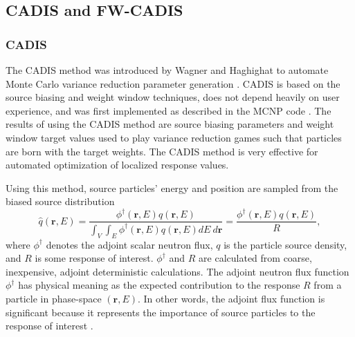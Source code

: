 \documentclass{article} %
\newcommand{\vecr}{\textbf{r}}
\newcommand{\qhat}{\ensuremath{\hat{q}}}
\newcommand{\fwc}{\mbox{FW-CADIS}}
\begin{document}
\subsection{CADIS and \fwc}

\subsubsection{CADIS}

The CADIS method was introduced by Wagner and Haghighat to automate Monte
Carlo variance reduction parameter generation \cite{cadis}. CADIS is based on
the source biasing and weight window techniques, does not depend heavily on
user experience, and was first implemented as described 
in the MCNP code \cite{cadis}. The results of using the CADIS method are
source biasing parameters and weight window target values used to play
variance reduction games such that particles are born with the target weights.
The CADIS method is very effective for automated optimization of localized
response values.

Using this method, source particles' energy and position are sampled from the
biased source distribution
%
\begin{equation}
\qhat(\vecr,E) = 
\frac{\phi^{\dagger}(\vecr,E)q(\vecr,E)}
{\int_V\int_E\phi^{\dagger}(\vecr,E)q(\vecr,E) dE\ d\vecr} 
= \frac{\phi^{\dagger}(\vecr,E)q(\vecr,E)}{R},
\label{eq:cadis_sb}
\end{equation}
%
where $\phi^{\dagger}$ denotes the adjoint scalar neutron flux, $q$ is the
particle source density, and $R$ is some response of interest.
$\phi^{\dagger}$ and $R$ are calculated from coarse, inexpensive, adjoint
deterministic calculations. The adjoint neutron flux function $\phi^{\dagger}$
has physical meaning as the expected contribution to the response $R$ from a
particle in phase-space $(\vecr,E)$. In other words, the adjoint flux
function is significant because it represents the importance of source
particles to the response of interest \cite{bg}.
\end{document}

